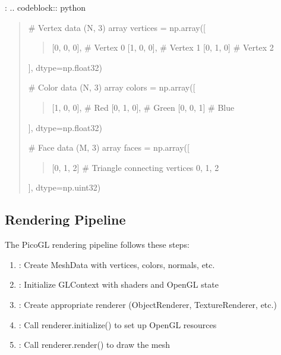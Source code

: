 \documentclass[a4paper,10pt,english,openany,oneside]{sphinxmanual}
\begin{document}
\sphinxAtStartPar
{}:
.. code\sphinxhyphen{}block:: python
\begin{quote}

\sphinxAtStartPar
\# Vertex data (N, 3) array
vertices = np.array({[}
\begin{quote}

\sphinxAtStartPar
{[}0, 0, 0{]},  \# Vertex 0
{[}1, 0, 0{]},  \# Vertex 1
{[}0, 1, 0{]}   \# Vertex 2
\end{quote}

\sphinxAtStartPar
{]}, dtype=np.float32)

\sphinxAtStartPar
\# Color data (N, 3) array
colors = np.array({[}
\begin{quote}

\sphinxAtStartPar
{[}1, 0, 0{]},  \# Red
{[}0, 1, 0{]},  \# Green
{[}0, 0, 1{]}   \# Blue
\end{quote}

\sphinxAtStartPar
{]}, dtype=np.float32)

\sphinxAtStartPar
\# Face data (M, 3) array
faces = np.array({[}
\begin{quote}

\sphinxAtStartPar
{[}0, 1, 2{]}   \# Triangle connecting vertices 0, 1, 2
\end{quote}

\sphinxAtStartPar
{]}, dtype=np.uint32)
\end{quote}


\subsection{Rendering Pipeline}
\label{\detokenize{api/renderer:rendering-pipeline}}
\sphinxAtStartPar
The PicoGL rendering pipeline follows these steps:
\begin{enumerate}
%
\item {} 
\sphinxAtStartPar
{}: Create MeshData with vertices, colors, normals, etc.

\item {} 
\sphinxAtStartPar
{}: Initialize GLContext with shaders and OpenGL state

\item {} 
\sphinxAtStartPar
{}: Create appropriate renderer (ObjectRenderer, TextureRenderer, etc.)

\item {} 
\sphinxAtStartPar
{}: Call renderer.initialize() to set up OpenGL resources

\item {} 
\sphinxAtStartPar
{}: Call renderer.render() to draw the mesh

\end{enumerate}
\end{document}
